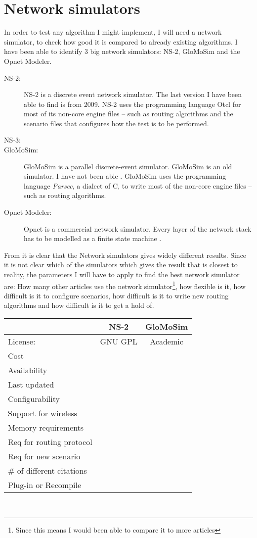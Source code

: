 \section{Network simulators}

In order to test any algorithm I might implement, I will need a network simulator, to check how good it is compared to already existing algorithms. I have been able to identify 3 big network simulators: NS-2, GloMoSim and the Opnet Modeler.

\begin{description}
\item[NS-2:] NS-2 is a discrete event network simulator. The last version I have been able to find is from 2009. NS-2 uses the programming language Otcl for most of its non-core engine files -- such as routing algorithms and the scenario files that configures how the test is to be performed.
\item[NS-3:]
\item[GloMoSim:] GloMoSim is a parallel discrete-event simulator. GloMoSim is an old simulator. I have not been able   . GloMoSim uses the programming language \emph{Parsec}, a dialect of C, to write most of the non-core engine files -- such as routing algorithms. 
\item[Opnet Modeler:] Opnet is a commercial network simulator. Every layer of the network stack has to be modelled as a finite state machine \cite{MANcom}.
\end{description}

From \cite{MANcom} it is clear that the Network simulators gives widely different results. Since it is not clear which of the simulators which gives the result that is closest to reality, the parameters I will have to apply to find the best network simulator are: How many other articles use the network simulator\footnote{Since this means I would been able to compare it to more articles}, how flexible is it, how difficult is it to configure scenarios, how difficult is it to write new routing algorithms and how difficult is it to get a hold of.

\begin{tabular}[3]{l|c|c}
 & NS-2 & GloMoSim \\
\hline
License: & GNU GPL & Academic \\
\hline
Cost & & \\
Availability & & \\
Last updated & & \\
Configurability & & \\
Support for wireless & & \\
Memory requirements & & \\
Req for routing protocol & & \\
Req for new scenario & & \\
\# of different citations & & \\
Plug-in or Recompile & & \\
\end{tabular}\\

